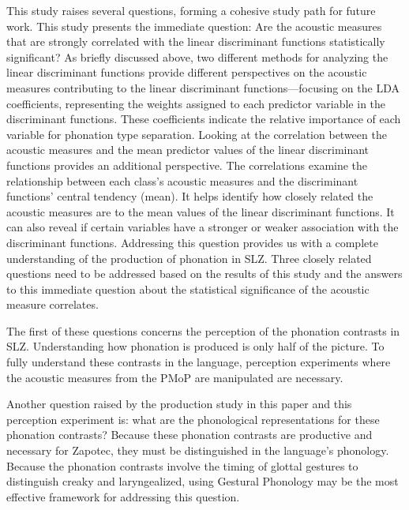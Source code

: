 \documentclass[12pt, letterpaper]{article}
\begin{document}
This study raises several questions, forming a cohesive study path for future work. This study presents the immediate question: Are the acoustic measures that are strongly correlated with the linear discriminant functions statistically significant? As briefly discussed above, two different methods for analyzing the linear discriminant functions provide different perspectives on the acoustic measures contributing to the linear discriminant functions—focusing on the LDA coefficients, representing the weights assigned to each predictor variable in the discriminant functions. These coefficients indicate the relative importance of each variable for phonation type separation. Looking at the correlation between the acoustic measures and the mean predictor values of the linear discriminant functions provides an additional perspective. The correlations examine the relationship between each class's acoustic measures and the discriminant functions' central tendency (mean). It helps identify how closely related the acoustic measures are to the mean values of the linear discriminant functions. It can also reveal if certain variables have a stronger or weaker association with the discriminant functions. Addressing this question provides us with a complete understanding of the production of phonation in SLZ. Three closely related questions need to be addressed based on the results of this study and the answers to this immediate question about the statistical significance of the acoustic measure correlates.

The first of these questions concerns the perception of the phonation contrasts in SLZ. Understanding how phonation is produced is only half of the picture. To fully understand these contrasts in the language, perception experiments where the acoustic measures from the PMoP are manipulated are necessary.

Another question raised by the production study in this paper and this perception experiment is: what are the phonological representations for these phonation contrasts? Because these phonation contrasts are productive and necessary for Zapotec, they must be distinguished in the language's phonology. Because the phonation contrasts involve the timing of glottal gestures to distinguish creaky and laryngealized, using Gestural Phonology \citep{browmanArticulatoryGesturesPhonological1989,browmanArticulatoryPhonologyOverview1992} may be the most effective framework for addressing this question. 
\end{document}
